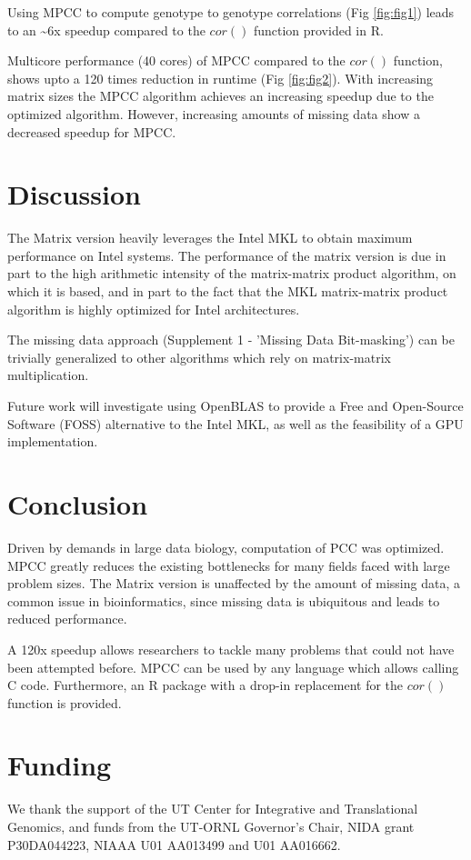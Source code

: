 \documentclass{bioinfo}
\begin{document}
Using MPCC to compute genotype to genotype correlations (Fig \ref{fig:fig1}) leads to 
an \textasciitilde{}6x speedup compared to the $cor()$ function provided in R.

Multicore performance (40 cores) of MPCC compared to the $cor()$ function, shows upto a 
120 times reduction in runtime (Fig \ref{fig:fig2}). With increasing matrix sizes 
the MPCC algorithm achieves an increasing speedup due to the optimized algorithm. 
However, increasing amounts of missing data show a decreased speedup for MPCC.
\vspace*{-5mm}
\section{Discussion}
The Matrix version heavily leverages the Intel\textregistered{} MKL to obtain 
maximum performance on Intel\textregistered{} systems. The performance of the 
matrix version is due in part to the high arithmetic intensity of the 
matrix-matrix product algorithm, on which it is based, and in 
part to the fact that the MKL matrix-matrix product algorithm is highly 
optimized for Intel architectures.  

The missing data approach (Supplement 1 - 'Missing Data Bit-masking') can be 
trivially generalized to other algorithms which rely on matrix-matrix multiplication.

Future work will investigate using OpenBLAS to provide a Free and Open-Source 
Software (FOSS) alternative to the Intel\textregistered{} MKL, as well as the 
feasibility of a GPU implementation.
\vspace*{-5mm}
\section{Conclusion}
Driven by demands in large data biology, computation of PCC was optimized. 
MPCC greatly reduces the existing bottlenecks for many fields faced with 
large problem sizes. The Matrix version is unaffected by the amount of 
missing data, a common issue in bioinformatics, since missing data is 
ubiquitous and leads to reduced performance.

A 120x speedup allows researchers to tackle many problems that could 
not have been attempted before. MPCC can be used by any language which 
allows calling C code. Furthermore, an R package with a drop-in 
replacement for the $cor()$ function is provided.
\vspace*{-5mm}
\section*{Funding}
We thank the support of the UT Center for Integrative and Translational Genomics, 
and funds from the UT-ORNL Governor's Chair, NIDA grant P30DA044223, NIAAA U01 
AA013499 and U01 AA016662.
\vspace*{-5mm}


\end{document}
